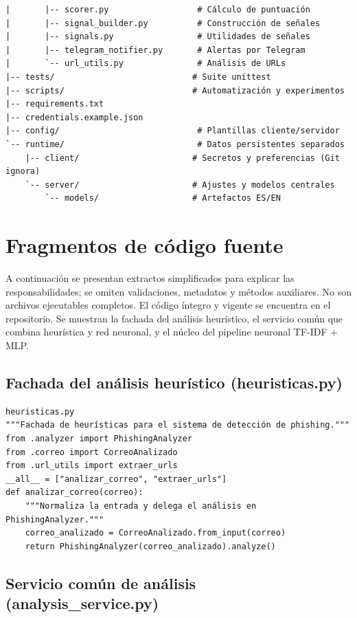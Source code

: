 \documentclass[11pt,a4paper,oneside]{report}
\begin{document}
\begin{lstlisting}
|       |-- scorer.py                  # Cálculo de puntuación
|       |-- signal_builder.py          # Construcción de señales
|       |-- signals.py                 # Utilidades de señales
|       |-- telegram_notifier.py       # Alertas por Telegram
|       `-- url_utils.py               # Análisis de URLs
|-- tests/                            # Suite unittest
|-- scripts/                          # Automatización y experimentos
|-- requirements.txt
|-- credentials.example.json
|-- config/                            # Plantillas cliente/servidor
`-- runtime/                           # Datos persistentes separados
    |-- client/                       # Secretos y preferencias (Git ignora)
    `-- server/                       # Ajustes y modelos centrales
        `-- models/                   # Artefactos ES/EN
\end{lstlisting}

\chapter{Fragmentos de código fuente}

A continuación se presentan extractos simplificados para explicar las responsabilidades; se omiten validaciones, metadatos y métodos auxiliares. No son archivos ejecutables completos. El código íntegro y vigente se encuentra en el repositorio. Se muestran la fachada del análisis heurístico, el servicio común que combina heurística y red neuronal, y el núcleo del pipeline neuronal TF-IDF + MLP.

\section{Fachada del análisis heurístico (heuristicas.py)}

\begin{lstlisting}
heuristicas.py
"""Fachada de heurísticas para el sistema de detección de phishing."""
from .analyzer import PhishingAnalyzer
from .correo import CorreoAnalizado
from .url_utils import extraer_urls
__all__ = ["analizar_correo", "extraer_urls"]
def analizar_correo(correo):
    """Normaliza la entrada y delega el análisis en PhishingAnalyzer."""
    correo_analizado = CorreoAnalizado.from_input(correo)
    return PhishingAnalyzer(correo_analizado).analyze()
\end{lstlisting}

\section{Servicio común de análisis (analysis\_service.py)}
\end{document}
